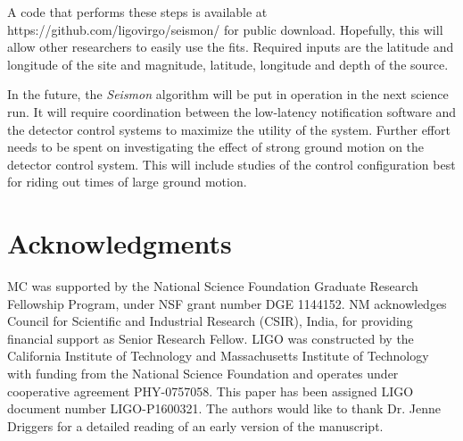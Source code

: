 \documentclass[twocolumn, aps, superscriptaddress]{revtex4}
\begin{document}
A code that performs these steps is available at https://github.com/ligovirgo/seismon/ for public download. Hopefully, this will allow other researchers to easily use the fits. Required inputs are the latitude and longitude of the site and magnitude, latitude, longitude and depth of the source.

In the future, the \emph{Seismon} algorithm will be put in operation in the next science run. It will require coordination between the low-latency notification software and the detector control systems to maximize the utility of the system. 
Further effort needs to be spent on investigating the effect of strong ground motion on the detector control system.
This will include studies of the control configuration best for riding out times of large ground motion.

\section{Acknowledgments}
MC was supported by the National Science Foundation Graduate Research Fellowship
Program, under NSF grant number DGE 1144152. 
NM acknowledges Council for Scientific and Industrial Research (CSIR), India, for providing financial support as Senior Research Fellow.  
LIGO was constructed by the California Institute of Technology and Massachusetts Institute of Technology with funding from the National Science Foundation and operates under cooperative agreement PHY-0757058.
This paper has been assigned LIGO document number LIGO-P1600321.
The authors would like to thank Dr. Jenne Driggers for a detailed reading of an early version of the manuscript.



\end{document}

